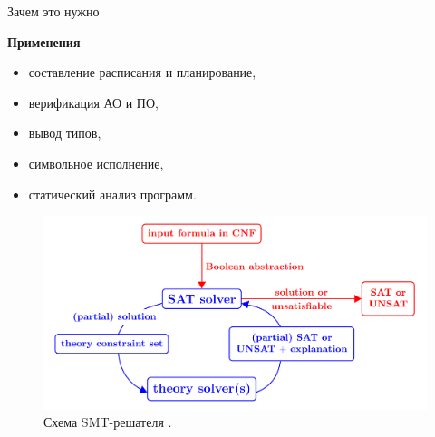 \documentclass[14pt,aspectratio=169,hyperref={pdftex,unicode},xcolor=dvipsnames]{beamer}
\begin{document}
\begin{frame}{Зачем это нужно}

\begin{minipage}{0.5\textwidth}

\textbf{Применения}
\begin{itemize}
  \item составление расписания и планирование,
  \item верификация АО и ПО,
  \item вывод типов,
  \item {\color{magenta}символьное исполнение},
  \item статический анализ программ.
\end{itemize}

\end{minipage}%
\begin{minipage}{0.5\textwidth}

\begin{figure}[ht]
\begin{center}
  \includegraphics[scale=0.125]{./assets/smt-solver-working-scheme.png}
  \caption{\label{smt-solver-working-scheme} Схема SMT-решателя \cite{smt-solver-working-scheme}.}
\end{center}
\end{figure}

\end{minipage}

\end{frame}
\end{document}
